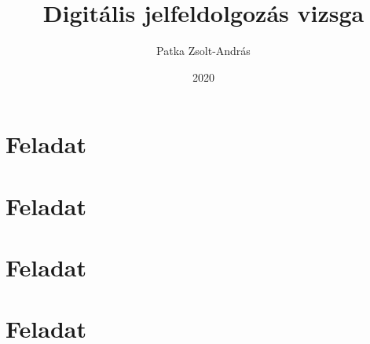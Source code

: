 \documentclass[12pt]{article}
\title{
	{Digitális jelfeldolgozás vizsga}
}
\author{Patka Zsolt-András}
\date{2020}
\begin{document}
\maketitle
{}

\tableofcontents
\listoffigures



\section{Feladat}


\section{Feladat}


\section{Feladat}


\section{Feladat}


\appendix

\end{document}
